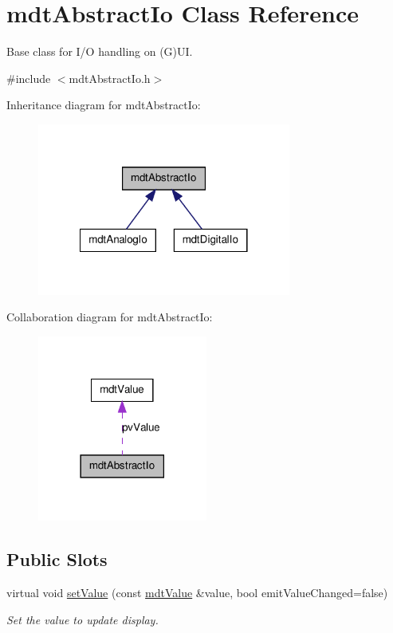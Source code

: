 \hypertarget{classmdt_abstract_io}{
\section{mdtAbstractIo Class Reference}
\label{classmdt_abstract_io}
}


Base class for I/O handling on (G)UI.  




{\ttfamily \#include $<$mdtAbstractIo.h$>$}



Inheritance diagram for mdtAbstractIo:\nopagebreak
\begin{figure}[H]
\begin{center}
\leavevmode
\includegraphics[width=236pt]{classmdt_abstract_io__inherit__graph}
\end{center}
\end{figure}


Collaboration diagram for mdtAbstractIo:\nopagebreak
\begin{figure}[H]
\begin{center}
\leavevmode
\includegraphics[width=158pt]{classmdt_abstract_io__coll__graph}
\end{center}
\end{figure}
\subsection*{Public Slots}
\begin{DoxyCompactItemize}
\item 
virtual void \hyperlink{classmdt_abstract_io_a3f5fc9ed13c2ec2aad0987cd15d95e31}{setValue} (const \hyperlink{classmdt_value}{mdtValue} \&value, bool emitValueChanged=false)
\begin{DoxyCompactList}\small\item\em Set the value to update display. \end{DoxyCompactList}\end{DoxyCompactItemize}
